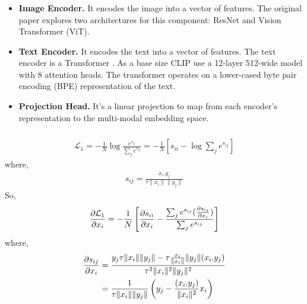 \documentclass{article}
\begin{document}
\subsubsection{}
\begin{itemize}
    \item \textbf{Image Encoder.} It encodes the image into a vector of features. 
    The original paper explores two architectures for this component: ResNet and 
    Vision Transformer (ViT).
    \item \textbf{Text Encoder.} It encodes the text into a vector of features. 
    The text encoder is a Transformer 
    . As a base size CLIP use a 12-layer 512-wide
    model with 8 attention heads. The transformer operates on a
    lower-cased byte pair encoding (BPE) representation of the
    text.
    \item \textbf{Projection Head.} It's a linear projection to map from
    each encoder's representation to the multi-modal embedding space.
\end{itemize}


\subsubsection{}
\begin{align*}
    \mathcal{L}_1 = -\frac{1}{N} \log \frac{e^{s_{ii}}}{\sum_j e^{s_{ij}}}
    = -\frac{1}{N}\left[s_{ii} - \log \sum_j e^{s_{ij}}\right]
\end{align*}
where, 
\begin{align*}
    s_{ij} = \frac{x_i.y_j }{\tau \lVert x_i \rVert \lVert y_j \rVert} 
\end{align*}
So, 
\begin{align*}
    \pdv{\mathcal{L}_1}{x_i} = -\frac{1}{N} \left[ \pdv{s_{ii}}{x_i} 
    - \frac{\sum_j e^{s_{ij}} (\pdv{s_{ij}}{x_i})}{\sum_j e^{s_{ij}}}\right]
\end{align*}
where, 
\begin{align*}
    \pdv{s_{ij}}{x_i} 
    &= \frac{y_j \tau \lVert x_i\rVert \lVert y_j \rVert 
            - \tau \frac{x_i}{\lVert x_i \rVert} \lVert y_j\rVert (x_i . y_j)}
            {\tau^2 \lVert x_i\rVert ^ 2 \lVert y_j\rVert^2} \\
    &= \frac{1}{\tau \lVert x_i\rVert \lVert y_j\rVert} \left(y_j 
    - \frac{(x_i . y_j)}{\lVert x_i\rVert^2} x_i \right)
\end{align*}
\end{document}
